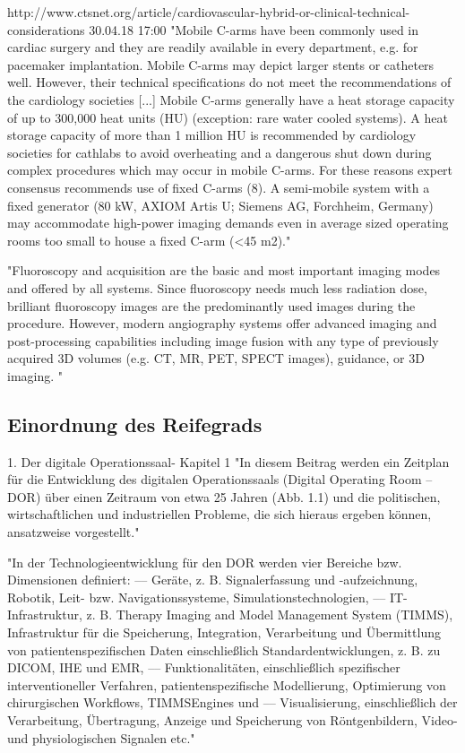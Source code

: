 http://www.ctsnet.org/article/cardiovascular-hybrid-or-clinical-technical-considerations 30.04.18 17:00	
	"Mobile C-arms have been commonly used in cardiac surgery and they are readily available in every department, e.g. for pacemaker implantation. Mobile C-arms may depict larger stents or catheters well. However, their technical specifications do not meet the recommendations of the cardiology societies [...] 
	Mobile C-arms generally have a heat storage capacity of up to 300,000 heat units (HU) (exception: rare water cooled systems). A heat storage capacity of more than 1 million HU is recommended by cardiology societies for cathlabs to avoid overheating and a dangerous shut down during complex procedures which may occur in mobile C-arms. For these reasons expert consensus recommends use of fixed C-arms (8). A semi-mobile system with a fixed generator (80 kW, AXIOM Artis U; Siemens AG, Forchheim, Germany) may accommodate high-power imaging demands even in average sized operating rooms too small to house a fixed C-arm (<45 m2)."
	
	"Fluoroscopy and acquisition are the basic and most important imaging modes and offered by all systems. Since fluoroscopy needs much less radiation dose, brilliant fluoroscopy images are the predominantly used images during the procedure. However, modern angiography systems offer advanced imaging and post-processing capabilities including image fusion with any type of previously acquired 3D volumes (e.g. CT, MR, PET, SPECT images), guidance, or 3D imaging.  "
	
	
\subsection{Einordnung des Reifegrads}
1. Der digitale Operationssaal- Kapitel 1
	"In diesem Beitrag werden ein Zeitplan für die Entwicklung
	des digitalen Operationssaals (Digital Operating Room – DOR) über einen Zeitraum
	von etwa 25 Jahren (Abb. 1.1) und die politischen, wirtschaftlichen und industriellen
	Probleme, die sich hieraus ergeben können, ansatzweise vorgestellt."

	"In der Technologieentwicklung für den DOR werden vier Bereiche bzw. Dimensionen
	definiert:
	–– Geräte, z. B. Signalerfassung und -aufzeichnung, Robotik, Leit- bzw. Navigationssysteme,
	Simulationstechnologien,
	–– IT-Infrastruktur, z. B. Therapy Imaging and Model Management System (TIMMS),
	Infrastruktur für die Speicherung, Integration, Verarbeitung und Übermittlung
	von patientenspezifischen Daten einschließlich Standardentwicklungen, z. B. zu
	DICOM, IHE und EMR,
	–– Funktionalitäten, einschließlich spezifischer interventioneller Verfahren, patientenspezifische
	Modellierung, Optimierung von chirurgischen Workflows, TIMMSEngines
	und
	–– Visualisierung, einschließlich der Verarbeitung, Übertragung, Anzeige und Speicherung
	von Röntgenbildern, Video- und physiologischen Signalen etc."

